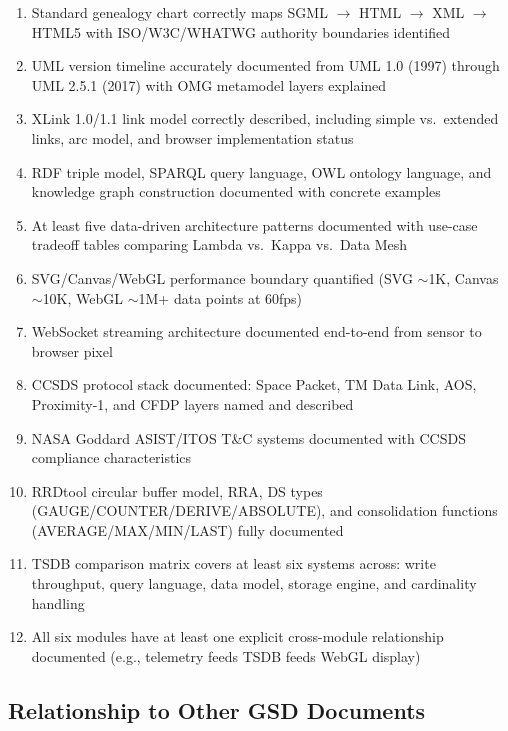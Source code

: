 \documentclass[11pt,letterpaper]{article}
\begin{document}
\begin{enumerate}
  \item Standard genealogy chart correctly maps SGML $\rightarrow$ HTML $\rightarrow$ XML $\rightarrow$ HTML5 with ISO/W3C/WHATWG authority boundaries identified
  \item UML version timeline accurately documented from UML 1.0 (1997) through UML 2.5.1 (2017) with OMG metamodel layers explained
  \item XLink 1.0/1.1 link model correctly described, including simple vs.\ extended links, arc model, and browser implementation status
  \item RDF triple model, SPARQL query language, OWL ontology language, and knowledge graph construction documented with concrete examples
  \item At least five data-driven architecture patterns documented with use-case tradeoff tables comparing Lambda vs.\ Kappa vs.\ Data Mesh
  \item SVG/Canvas/WebGL performance boundary quantified (SVG $\sim$1K, Canvas $\sim$10K, WebGL $\sim$1M+ data points at 60fps)
  \item WebSocket streaming architecture documented end-to-end from sensor to browser pixel
  \item CCSDS protocol stack documented: Space Packet, TM Data Link, AOS, Proximity-1, and CFDP layers named and described
  \item NASA Goddard ASIST/ITOS T\&C systems documented with CCSDS compliance characteristics
  \item RRDtool circular buffer model, RRA, DS types (GAUGE/COUNTER/DERIVE/ABSOLUTE), and consolidation functions (AVERAGE/MAX/MIN/LAST) fully documented
  \item TSDB comparison matrix covers at least six systems across: write throughput, query language, data model, storage engine, and cardinality handling
  \item All six modules have at least one explicit cross-module relationship documented (e.g., telemetry feeds TSDB feeds WebGL display)
\end{enumerate}

\subsection{Relationship to Other GSD Documents}
\end{document}
